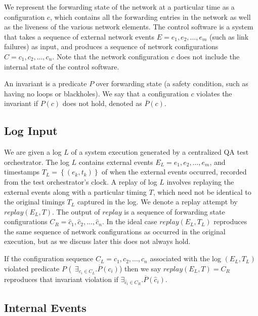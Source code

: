 
We represent the forwarding state of the network
at a particular time as a configuration $c$, which contains all the forwarding
entries in the network
as well as the liveness of the various network elements.
The control software is a system %
that takes a sequence of
external network events $E = e_1,e_2,\dots,e_m$ (such as link failures) as input,
and produces a sequence of network configurations
$C = c_1,c_2,\dots,c_n$. Note that the network configuration $c$ does not
include the internal state of the control software.

An invariant is a predicate $P$ over forwarding state (a safety
condition, such as having no loops or blackholes). We say that a configuration
$c$ violates the invariant if $P(c)$ does not
hold, denoted as $\overline{P}(c)$.

\subsection{Log Input}

We are given a log $L$ of a system execution generated
by a centralized QA test orchestrator. The log $L$ contains external
events $E_L = e_1,e_2,\dots,e_m$, and
timestamps $T_L = \left\{ (e_k, t_k) \right\}$ of when the external events
occurred, recorded from the test orchestrator's clock.
A replay of log $L$ involves replaying the external events along with a
particular timing $T$,
which need not be identical to the original timings $T_L$ captured in the
log. We
denote a replay attempt by $replay(E_L,T)$.
The output of $replay$ is a sequence of forwarding state configurations
$C_R = \hat{c}_1,\hat{c}_2,\dots,\hat{c}_n$. In the ideal case $replay(E_L,T_L)$ reproduces the same
sequence of network configurations as occurred in the original execution, but as we discuss later
this does not always hold.

If the configuration sequence $C_L = c_1,c_2,\dots,c_n$ associated with the log $(E_L, T_L)$ violated predicate $P$
(\ie~$\exists_{c_i \in C_L}. \overline{P}(c_i)$)
then we say $replay(E_L,T) = C_R$ reproduces that invariant violation if
$\exists_{\hat{c}_i \in C_R}. \overline{P}(\hat{c}_i)$.

\subsection{Internal Events}

